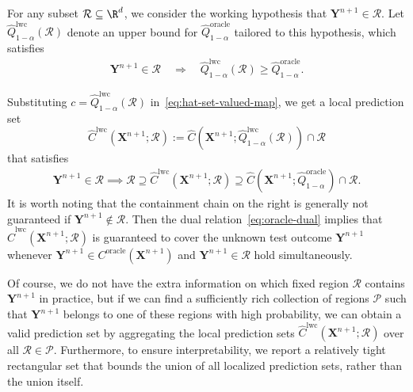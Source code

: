 For any subset $\mathcal{R} \subseteq \R^d$, we consider the working hypothesis that $\mathbf{Y}^{n+1} \in \mathcal{R}$.
Let $\hat{Q}^\mathrm{lwc}_{1-\alpha}(\mathcal{R})$ denote an upper bound for $\hat{Q}^{\mathrm{oracle}}_{1-\alpha}$ tailored to this hypothesis, which satisfies
\begin{align}\label{eq:lwc-upperbound}
  \mathbf{Y}^{n+1} \in \mathcal{R} \quad \Longrightarrow \quad \hat{Q}^\mathrm{lwc}_{1-\alpha}(\mathcal{R}) \geq \hat{Q}^{\mathrm{oracle}}_{1-\alpha}.
\end{align}
{\color{blue}
Substituting $c = \hat{Q}^\mathrm{lwc}_{1-\alpha}(\mathcal{R})$ in~\eqref{eq:hat-set-valued-map}, we get a local prediction set 
\begin{equation}\label{eq:lwc-prediction}
    \hat{C}^\mathrm{lwc} (\mathbf{X}^{n+1}; \mathcal{R}):=\hat{C}(\mathbf{X}^{n+1}; \hat{Q}^\mathrm{lwc}_{1-\alpha}(\mathcal{R})) \cap \mathcal{R}
\end{equation}
that satisfies
\begin{align} \label{eq:lwc-local-containment}
  \mathbf{Y}^{n+1} \in \mathcal{R} \implies \mathcal{R} \supseteq \hat{C}^\mathrm{lwc} (\mathbf{X}^{n+1}; \mathcal{R}) \supseteq \hat{C}(\mathbf{X}^{n+1}; \hat{Q}^{\mathrm{oracle}}_{1-\alpha}) \cap \mathcal{R}.
\end{align}
It is worth noting that the containment chain on the right is generally not guaranteed if $\mathbf{Y}^{n+1} \notin \mathcal{R}$. Then the dual relation~\eqref{eq:oracle-dual} implies that $\hat{C}^\mathrm{lwc} (\mathbf{X}^{n+1}; \mathcal{R})$
is guaranteed to cover the unknown test outcome $\mathbf{Y}^{n+1}$ whenever $\mathbf Y^{n+1} \in C^\mathrm{oracle}(\mathbf{X}^{n+1})$ and $\mathbf{Y}^{n+1} \in \mathcal{R}$ hold simultaneously. 

Of course, we do not have the extra information on which fixed region $\mathcal{R}$ contains $\mathbf{Y}^{n+1}$ in practice, but if we can find a sufficiently rich collection of regions $\mathcal{P}$ such that $\mathbf{Y}^{n+1}$ belongs to one of these regions with high probability, we can obtain a valid prediction set by aggregating the local prediction sets $\hat{C}^\mathrm{lwc}(\mathbf{X}^{n+1}; \mathcal{R})$ over all $\mathcal{R} \in \mathcal{P}$. Furthermore, to ensure interpretability, we report a relatively tight rectangular set that bounds the union of all localized prediction sets, rather than the union itself.

}
